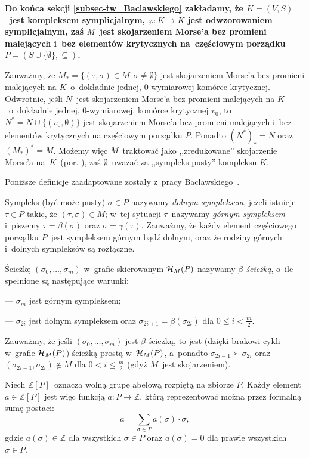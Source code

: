 \textbf{Do końca sekcji \ref{subsec-tw_Baclawskiego} zakładamy, że $K=(V,S)$~jest kompleksem symplicjalnym, $\varphi\colon K\to K$ jest odwzorowaniem symplicjalnym, zaś $M$~jest skojarzeniem Morse'a bez promieni malejących i~bez elementów krytycznych na~częściowym porządku $P=(S\cup\{\emptyset\},\subseteq)$.} 

Zauważmy, że $M_*=\{(\tau,\sigma)\in M:\sigma\not=\emptyset\}$ jest skojarzeniem Morse'a bez promieni malejących na $K$~o~dokładnie jednej, $0$-wymiarowej komórce krytycznej. Odwrotnie, jeśli $N$~jest skojarzeniem Morse'a bez promieni malejących na $K$~o~dokładnie jednej, $0$-wymiarowej, komórce krytycznej $v_0$, to $N^*=N\cup\{(v_0,\emptyset)\}$ jest skojarzeniem Morse'a bez promieni malejących i~bez elementów krytycznych na częściowym porządku $P$. Ponadto $(N^*)_*=N$ oraz $(M_*)^*=M$. Możemy więc $M$~traktować jako ,,zredukowane'' skojarzenie Morse'a na~$K$~(por. \cite{Forman02}), zaś $\emptyset$~uważać za ,,sympleks pusty'' kompleksu $K$.

Poniższe definicje zaadaptowane zostały z~pracy Baclawskiego~\cite{Baclawski12}.

Sympleks (być może pusty) $\sigma\in P$ nazywamy \textit{dolnym sympleksem}, jeżeli istnieje $\tau\in P$ takie, że $(\tau,\sigma)\in M$; w~tej sytuacji $\tau$~nazywamy \textit{górnym sympleksem} i~piszemy $\tau=\beta(\sigma)$ oraz $\sigma=\gamma(\tau)$. Zauważmy, że każdy element częściowego porządku $P$~jest sympleksem górnym bądź dolnym, oraz że rodziny górnych i~dolnych sympleksów są rozłączne.

Ścieżkę $(\sigma_0,\ldots,\sigma_m)$ w~grafie skierowanym $\mathcal{H}_M(P)$ nazywamy \mbox{\textit{$\beta$-ścieżką}}, o~ile spełnione są następujące warunki:
\begin{compactitem}
\item[---] $\sigma_m$ jest górnym sympleksem;
\item[---] $\sigma_{2i}$ jest dolnym sympleksem oraz $\sigma_{2i+1}=\beta(\sigma_{2i})$ dla $0\leq i < \frac{m}{2}$.
\end{compactitem}
Zauważmy, że jeśli $(\sigma_0,\ldots,\sigma_m)$ jest $\beta$-ścieżką, to jest (dzięki brakowi cykli w~grafie $\mathcal{H}_M(P)$) ścieżką prostą w~$\mathcal{H}_M(P)$, a~ponadto $\sigma_{2i-1}\succ \sigma_{2i}$ oraz $(\sigma_{2i-1},\sigma_{2i})\not\in M$ dla $0<i\leq \frac{m}{2}$ (gdyż $M$~jest skojarzeniem).

Niech $\mathbb{Z}[P]$~oznacza wolną grupę abelową rozpiętą na zbiorze $P$. Każdy element $a\in \mathbb{Z}[P]$ jest więc funkcją $a\colon P\to \mathbb{Z}$, którą reprezentować można przez formalną sumę postaci: \[a=\sum_{\sigma\in P}a(\sigma)\cdot \sigma,\] gdzie $a(\sigma)\in\mathbb{Z}$ dla wszystkich $\sigma\in P$ oraz $a(\sigma)=0$ dla prawie wszystkich $\sigma\in P$.

